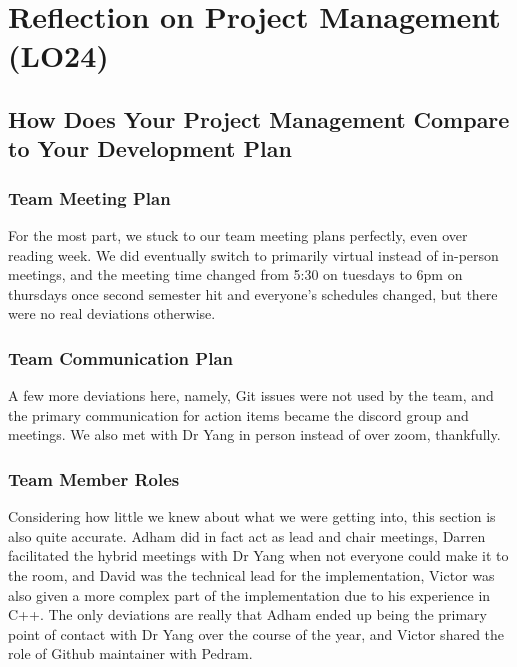 \documentclass{article}
\begin{document}
\section{Reflection on Project Management (LO24)}


\subsection{How Does Your Project Management Compare to Your Development Plan}

\subsubsection{Team Meeting Plan}
For the most part, we stuck to our team meeting plans perfectly, even over reading week. We did eventually switch to primarily virtual instead of in-person meetings, and the
meeting time changed from 5:30 on tuesdays to 6pm on thursdays once second semester hit and everyone's schedules changed, but there were no real deviations otherwise.

\subsubsection{Team Communication Plan}
A few  more deviations here, namely, Git issues were not used by the team, and the primary communication for action items became the discord group and meetings.
We also met with Dr Yang in person instead of over zoom, thankfully.
\subsubsection{Team Member Roles}
Considering how little we knew about what we were getting into, this section is also quite accurate. Adham did in fact act as lead and chair meetings, Darren facilitated the
hybrid meetings with Dr Yang when not everyone could make it to the room, and David was the technical lead for the implementation, Victor was also given a more complex part
of the implementation due to his experience in C++. The only deviations are really that Adham ended up being the primary point of contact with Dr Yang over the course of the
year, and Victor shared the role of Github maintainer with Pedram.
\end{document}
